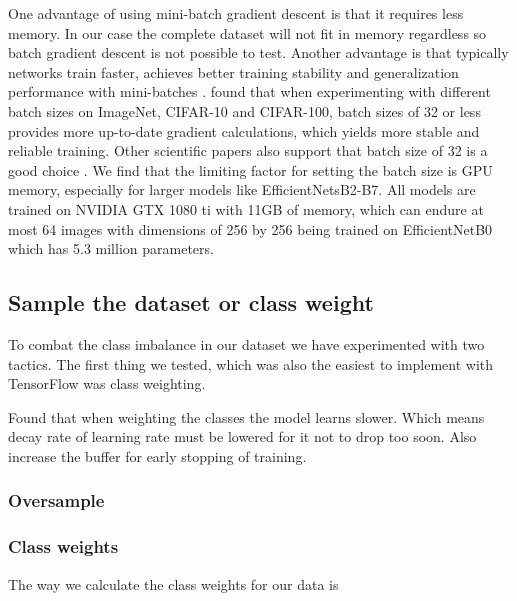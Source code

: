 \documentclass[thesis.tex]{subfiles}
\begin{document}
One advantage of using mini-batch gradient descent is that it requires less memory. In our case the complete dataset will not fit in memory regardless so batch gradient descent is not possible to test. Another advantage is that typically networks train faster, achieves better training stability and generalization performance with mini-batches \cite{RevisitingSmall18}. \citeauthor{RevisitingSmall18} found that when experimenting with different batch sizes on ImageNet, CIFAR-10 and CIFAR-100, batch sizes of 32 or less provides more up-to-date gradient calculations, which yields more stable and reliable training. Other scientific papers also support that batch size of 32 is a good choice \cite{PracticalRecommendations12, GeneralInefficiency03}.
We find that the limiting factor for setting the batch size is GPU memory, especially for larger models like EfficientNetsB2-B7. All models are trained on NVIDIA GTX 1080 ti with 11GB of memory, which can endure at most 64 images with dimensions of 256 by 256 being trained on EfficientNetB0 which has 5.3 million parameters.



\subsection{Sample the dataset or class weight}
To combat the class imbalance in our dataset we have experimented with two tactics. The first thing we tested, which was also the easiest to implement with TensorFlow was class weighting. 


Found that when weighting the classes the model learns slower. Which means decay rate of learning rate must be lowered for it not to drop too soon. Also increase the buffer for early stopping of training.


\subsubsection{Oversample}


\subsubsection{Class weights}
The way we calculate the class weights for our data is
\end{document}
